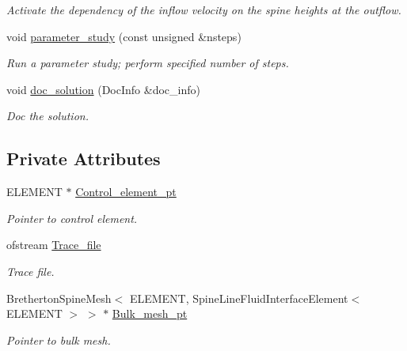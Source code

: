 \begin{DoxyCompactItemize}
\begin{DoxyCompactList}\small\item\em Activate the dependency of the inflow velocity on the spine heights at the outflow. \end{DoxyCompactList}\item 
void \hyperlink{classBrethertonProblem_ac24db9373e1a3005e6b14fc92c16b41c}{parameter\+\_\+study} (const unsigned \&nsteps)
\begin{DoxyCompactList}\small\item\em Run a parameter study; perform specified number of steps. \end{DoxyCompactList}\item 
void \hyperlink{classBrethertonProblem_ab6e29ecf0dbffabd4ce897203d35626e}{doc\+\_\+solution} (Doc\+Info \&doc\+\_\+info)
\begin{DoxyCompactList}\small\item\em Doc the solution. \end{DoxyCompactList}\end{DoxyCompactItemize}
\subsection*{Private Attributes}
\begin{DoxyCompactItemize}
\item 
E\+L\+E\+M\+E\+NT $\ast$ \hyperlink{classBrethertonProblem_ab1dfeabf599487ac4a121398c6a98368}{Control\+\_\+element\+\_\+pt}
\begin{DoxyCompactList}\small\item\em Pointer to control element. \end{DoxyCompactList}\item 
ofstream \hyperlink{classBrethertonProblem_ae37c09c1e0faf5ba8b347fab6a9f687f}{Trace\+\_\+file}
\begin{DoxyCompactList}\small\item\em Trace file. \end{DoxyCompactList}\item 
Bretherton\+Spine\+Mesh$<$ E\+L\+E\+M\+E\+NT, Spine\+Line\+Fluid\+Interface\+Element$<$ E\+L\+E\+M\+E\+NT $>$ $>$ $\ast$ \hyperlink{classBrethertonProblem_af293d72416de7a93ed51f20a5e4fb86e}{Bulk\+\_\+mesh\+\_\+pt}
\begin{DoxyCompactList}\small\item\em Pointer to bulk mesh. \end{DoxyCompactList}\end{DoxyCompactItemize}


